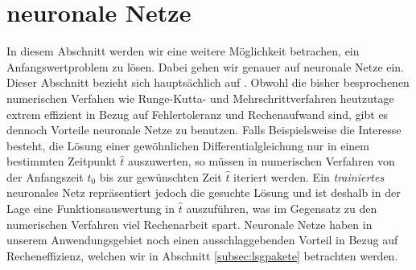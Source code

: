 \section{neuronale Netze}
In diesem Abschnitt werden wir eine weitere Möglichkeit betrachen, ein Anfangswertproblem zu lösen.
Dabei gehen wir genauer auf neuronale Netze ein. Dieser Abschnitt bezieht sich hauptsächlich auf
\cite{ovidiucalinDeepLearningArchitectures}. Obwohl die bisher besprochenen numerischen Verfahen wie Runge-Kutta- und
Mehrschrittverfahren heutzutage extrem effizient in Bezug auf Fehlertoleranz und Rechenaufwand sind, gibt es dennoch
Vorteile neuronale Netze zu benutzen. Falls Beispielsweise die Interesse besteht, die Lösung einer gewöhnlichen
Differentialgleichung nur in einem bestimmten Zeitpunkt $\hat{t}$ auszuwerten, so müssen in numerischen Verfahren von
der Anfangszeit $t_0$ bis zur gewünschten Zeit $\hat{t}$ iteriert werden. Ein \textit{trainiertes} neuronales Netz
repräsentiert jedoch die gesuchte Lösung und ist deshalb in der Lage eine Funktionsauswertung in $\hat{t}$ auszuführen,
was im Gegensatz zu den numerischen Verfahren viel Rechenarbeit spart. Neuronale Netze haben in unserem Anwendungsgebiet
noch einen ausschlaggebenden Vorteil in Bezug auf Recheneffizienz, welchen wir in Abschnitt \ref{subsec:lsgpakete}
betrachten werden.

